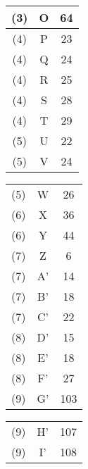 \begin{activite}
\begin{QCM}
\begin{center}
\begin{tabular}{|*{3}{C{0.5}|}}
            \hline
            (3) & O & 64 \\
            \hline
            (4) & P & 23 \\
            \hline
            (4) & Q & 24 \\
            \hline
            (4) & R & 25 \\
            \hline
            (4) & S & 28 \\
            \hline
            (4) & T & 29 \\
            \hline
            (5) & U & 22 \\
            \hline
            (5) & V & 24 \\
            \hline
         \end{tabular}
         \hfill
         \begin{tabular}{|*{3}{C{0.5}|}}
            \hline
             &  &  \\
            \hline
            (5) & W & 26 \\
            \hline
            (6) & X & 36 \\
            \hline
            (6) & Y & 44 \\
            \hline
            (7) & Z & 6 \\
            \hline
            (7) & A' & 14 \\
            \hline
            (7) & B' & 18 \\
            \hline
            (7) & C' & 22 \\
            \hline
            (8) & D' & 15 \\
            \hline
            (8) & E' & 18 \\
            \hline
            (8) & F' & 27 \\
            \hline
            (9) & G' & 103 \\
            \hline
         \end{tabular}
         \hfill
         \begin{tabular}{|*{3}{C{0.5}|}}
            \hline
             &  &  \\
            \hline
            (9) & H' & 107 \\
            \hline
            (9) & I' & 108 \\
            \hline

\end{tabular}
\end{center}
\end{QCM}
\end{activite}
